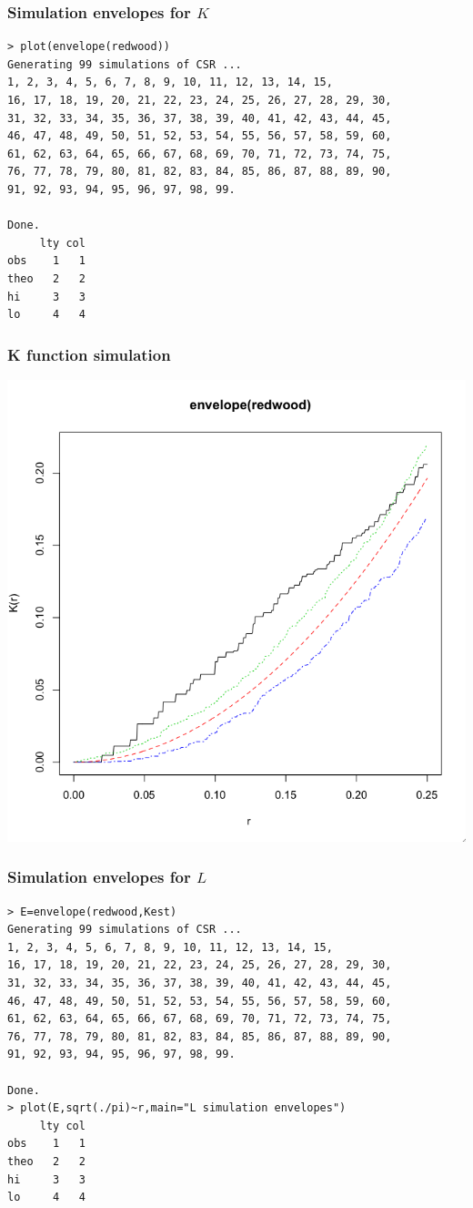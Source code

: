 \documentclass[nototal,handout]{beamer}
\begin{document}
  \begin{frame}[containsverbatim]
    \frametitle{Simulation envelopes for $K$}
    \begin{small}
      \begin{verbatim}
> plot(envelope(redwood))
Generating 99 simulations of CSR ...
1, 2, 3, 4, 5, 6, 7, 8, 9, 10, 11, 12, 13, 14, 15,
16, 17, 18, 19, 20, 21, 22, 23, 24, 25, 26, 27, 28, 29, 30,
31, 32, 33, 34, 35, 36, 37, 38, 39, 40, 41, 42, 43, 44, 45,
46, 47, 48, 49, 50, 51, 52, 53, 54, 55, 56, 57, 58, 59, 60,
61, 62, 63, 64, 65, 66, 67, 68, 69, 70, 71, 72, 73, 74, 75,
76, 77, 78, 79, 80, 81, 82, 83, 84, 85, 86, 87, 88, 89, 90,
91, 92, 93, 94, 95, 96, 97, 98, 99.

Done.
     lty col
obs    1   1
theo   2   2
hi     3   3
lo     4   4

      \end{verbatim}
    \end{small}
   \end{frame}



\begin{frame}[<+->]
    \frametitle{K function simulation}
    \begin{center}
      \includegraphics[width=.65\linewidth]{ksimredwood.png}
    \end{center}
  \end{frame}

  \begin{frame}[containsverbatim]
    \frametitle{Simulation envelopes for $L$}
    \begin{small}
      \begin{verbatim}
> E=envelope(redwood,Kest)
Generating 99 simulations of CSR ...
1, 2, 3, 4, 5, 6, 7, 8, 9, 10, 11, 12, 13, 14, 15,
16, 17, 18, 19, 20, 21, 22, 23, 24, 25, 26, 27, 28, 29, 30,
31, 32, 33, 34, 35, 36, 37, 38, 39, 40, 41, 42, 43, 44, 45,
46, 47, 48, 49, 50, 51, 52, 53, 54, 55, 56, 57, 58, 59, 60,
61, 62, 63, 64, 65, 66, 67, 68, 69, 70, 71, 72, 73, 74, 75,
76, 77, 78, 79, 80, 81, 82, 83, 84, 85, 86, 87, 88, 89, 90,
91, 92, 93, 94, 95, 96, 97, 98, 99.

Done.
> plot(E,sqrt(./pi)~r,main="L simulation envelopes")
     lty col
obs    1   1
theo   2   2
hi     3   3
lo     4   4
      \end{verbatim}
    \end{small}
   \end{frame}
\end{document}
